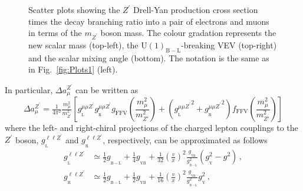 \documentclass[10pt]{report}
\newcommand{\g}[2]{g_{_\mathrm{#1}}^{#2}}
\newcommand{\ro}[1]{\textrm{#1}}
\newcommand{\U}[1]{\mathrm{U}(1)_{\mathrm{#1}}}
\begin{document}
\begin{figure}[!htb]
	\caption{Scatter plots showing the $Z^\prime$ Drell-Yan production cross section times the decay branching ratio into a pair of electrons and muons in terms of the $m_{Z^\prime}$ boson mass. The colour gradation represents the new scalar mass (top-left), the $\U{B-L}$-breaking VEV (top-right) and the scalar mixing angle (bottom). The notation is the same as in Fig.~\ref{fig:Plots1} (left). }
	\label{fig:Plots4}
\end{figure}	
In particular, $\Delta a_\mu^{Z^\prime}$ can be written as
\begin{equation}
\Delta a_\mu^{Z^\prime} = \tfrac{1}{4 \pi^2} \tfrac{m_\mu^2}{m_{Z^\prime}^2} \left[\g{L}{\mu \mu Z^\prime} \g{R}{\mu \mu Z^\prime} g_{\ro{FFV}}\left(\frac{m_\mu^2}{m_{Z'}^2}\right) + \left({\g{L}{\mu \mu Z^\prime}}^2 + {\g{R}{\mu \mu Z^\prime}}^2\right) f_{\ro{FFV}}\left(\frac{m_\mu^2}{m_{Z'}^2}\right) \right]
\label{eq:ZpContribution}
\end{equation}
where the left- and right-chiral projections of the charged lepton couplings to the $Z^\prime$ boson, $\g{L}{\ell \ell Z^\prime}$ and $\g{R}{\ell \ell Z^\prime}$, respectively, can be approximated as follows
\begin{equation}
\begin{aligned}
    \g{L}{\ell \ell Z^\prime} &\simeq \frac12\g{B-L}{} 
    +\frac14 \g{YB}{}
    + \frac{1}{32} \left(\frac{v}{x}\right)^2 \frac{\g{YB}{}}{\g{B-L}{2}} \left(\g{Y}{2} - g^2 \right)\,,
    \\
    \g{R}{\ell \ell Z^\prime} &\simeq \frac12\g{B-L}{}
    + \frac12\g{YB}{} 
    + \frac{1}{16} \left(\frac{v}{x}\right)^2 \frac{\g{YB}{}}{\g{B-L}{2}}\g{Y}{2}\,,
\end{aligned}\label{eq:gllZ}
\end{equation}
%
\end{document}
